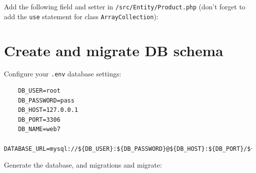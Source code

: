 \documentclass[a4paperpaper,openright]{book}
\newenvironment{Shaded}{}{}
\newcommand{\AnnotationTok}[1]{\textcolor[rgb]{0.38,0.63,0.69}{\textbf{\textit{#1}}}}
\newcommand{\CommentTok}[1]{\textcolor[rgb]{0.38,0.63,0.69}{\textit{#1}}}
\newcommand{\FunctionTok}[1]{\textcolor[rgb]{0.02,0.16,0.49}{#1}}
\newcommand{\KeywordTok}[1]{\textcolor[rgb]{0.00,0.44,0.13}{\textbf{#1}}}
\newcommand{\NormalTok}[1]{#1}
\newcommand{\OtherTok}[1]{\textcolor[rgb]{0.00,0.44,0.13}{#1}}
\newcommand{\StringTok}[1]{\textcolor[rgb]{0.25,0.44,0.63}{#1}}
\begin{document}
Add the following field and setter in \texttt{/src/Entity/Product.php}
(don't forget to add the \texttt{use} statement for class
\texttt{ArrayCollection}):

\begin{Shaded}
\end{Shaded}

\hypertarget{create-and-migrate-db-schema}{%
\section{Create and migrate DB
schema}\label{create-and-migrate-db-schema}}

Configure your \texttt{.env} database settings:

\begin{verbatim}
    DB_USER=root
    DB_PASSWORD=pass
    DB_HOST=127.0.0.1
    DB_PORT=3306
    DB_NAME=web7
    DATABASE_URL=mysql://${DB_USER}:${DB_PASSWORD}@${DB_HOST}:${DB_PORT}/${DB_NAME}
\end{verbatim}

Generate the database, and migrations and migrate:
\end{document}
